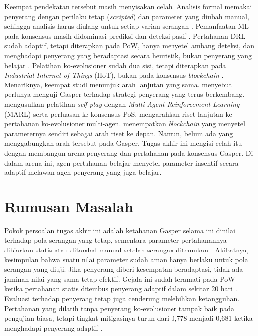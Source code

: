 Keempat pendekatan tersebut masih menyisakan celah. Analisis formal memakai penyerang dengan perilaku tetap (\textit{scripted}) dan parameter yang diubah manual, sehingga analisis harus diulang untuk setiap varian serangan \parencite{laneve2025stochastic}. Pemanfaatan ML pada konsensus masih didominasi prediksi dan deteksi pasif \parencite{rizal2025enhancing}. Pertahanan DRL sudah adaptif, tetapi diterapkan pada PoW, hanya menyetel ambang deteksi, dan menghadapi penyerang yang beradaptasi secara heuristik, bukan penyerang yang belajar \parencite{skowronski2026adaptive}. Pelatihan ko-evolusioner sudah dua sisi, tetapi diterapkan pada \textit{Industrial Internet of Things} (IIoT), bukan pada konsensus \textit{blockchain} \parencite{wushishi2026coadam}. Menariknya, keempat studi menunjuk arah lanjutan yang sama. \textcite{laneve2025stochastic} menyebut perlunya menguji Gasper terhadap strategi penyerang yang terus berkembang. \textcite{skowronski2026adaptive} mengusulkan pelatihan \textit{self-play} dengan \textit{Multi-Agent Reinforcement Learning} (MARL) serta perluasan ke konsensus PoS. \textcite{wushishi2026coadam} mengarahkan riset lanjutan ke pertahanan ko-evolusioner multi-agen. \textcite{rizal2025enhancing} menempatkan \textit{blockchain} yang menyetel parameternya sendiri sebagai arah riset ke depan. Namun, belum ada yang menggabungkan arah tersebut pada Gasper. Tugas akhir ini mengisi celah itu dengan membangun arena penyerang dan pertahanan pada konsensus Gasper. Di dalam arena ini, agen pertahanan belajar menyetel parameter insentif secara adaptif melawan agen penyerang yang juga belajar.

\section{Rumusan Masalah}
\label{sec:rumusan_masalah}
Pokok persoalan tugas akhir ini adalah ketahanan Gasper selama ini dinilai terhadap pola serangan yang tetap, sementara parameter pertahanannya dibiarkan statis atau ditambal manual setelah serangan ditemukan \parencite{laneve2025stochastic}. Akibatnya, kesimpulan bahwa suatu nilai parameter sudah aman hanya berlaku untuk pola serangan yang diuji. Jika penyerang diberi kesempatan beradaptasi, tidak ada jaminan nilai yang sama tetap efektif. Gejala ini sudah teramati pada PoW ketika pertahanan statis ditembus penyerang adaptif dalam sekitar 20 hari \parencite{skowronski2026adaptive}. Evaluasi terhadap penyerang tetap juga cenderung melebihkan ketangguhan. Pertahanan yang dilatih tanpa penyerang ko-evolusioner tampak baik pada pengujian biasa, tetapi tingkat mitigasinya turun dari 0,778 menjadi 0,681 ketika menghadapi penyerang adaptif \parencite{wushishi2026coadam}.

